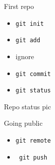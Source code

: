\documentclass{beamer}
\begin{document}
\begin{frame}{First repo}
  \begin{itemize}
    \item \texttt{git init}
    \item \texttt{git add}
    \item ignore
    \item \texttt{git commit}
    \item \texttt{git status}
  \end{itemize}
\end{frame}
\begin{frame}{Repo status}
pic
\end{frame}

\begin{frame}{Going public}
  \begin{itemize}
    \item \texttt{git remote}
    \item \texttt{ git push}
  \end{itemize}
\end{frame}
\end{document}
